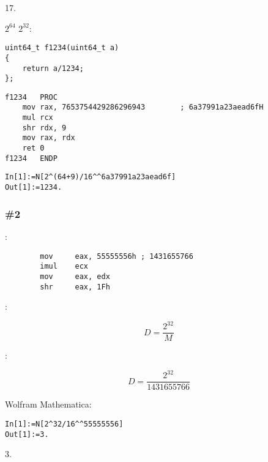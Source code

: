  17.

 $2^{64}$  $2^{32}$:

\begin{lstlisting}
uint64_t f1234(uint64_t a)
{
	return a/1234;
};
\end{lstlisting}

\begin{lstlisting}[caption=MSVC 2012 x64 /Ox]
f1234	PROC
	mov	rax, 7653754429286296943		; 6a37991a23aead6fH
	mul	rcx
	shr	rdx, 9
	mov	rax, rdx
	ret	0
f1234	ENDP
\end{lstlisting}

\begin{lstlisting}[caption=Wolfram Mathematica]
In[1]:=N[2^(64+9)/16^^6a37991a23aead6f]
Out[1]:=1234.
\end{lstlisting}

\subsubsection{ \#2}

:

\begin{lstlisting}
		mov     eax, 55555556h ; 1431655766
		imul    ecx
		mov     eax, edx
		shr     eax, 1Fh
\end{lstlisting}

:

\[
D=\frac{2^{32}}{M}
\]

:

\[
D=\frac{2^{32}}{1431655766}
\]

 Wolfram Mathematica:

\begin{lstlisting}[caption=Wolfram Mathematica]
In[1]:=N[2^32/16^^55555556]
Out[1]:=3.
\end{lstlisting}

 3.


